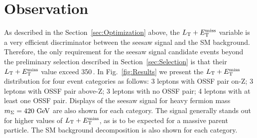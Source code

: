 \chapter{Observation}
\label{sec:Results}

As described in the Section~\ref{sec:Optimization} above, the $L_\textrm{T} + E_{\mathrm{T}}^{\text{miss}}$ variable is a very efficient discriminator between the seesaw signal and the SM background. Therefore, the only requirement for the seesaw signal candidate events beyond the preliminary selection described in Section~\ref{sec:Selection} is that their $L_\textrm{T} + E_{\mathrm{T}}^{\text{miss}}$ value exceed 350\,\GeV. In Fig.~\ref{fig:Results} we present the $L_\textrm{T} + E_{\mathrm{T}}^{\text{miss}}$ distribution for four event categories as follows: 3 leptons with OSSF pair on-Z; 3 leptons with OSSF pair above-Z; 3 leptons with no OSSF pair; 4 leptons with at least one OSSF pair. Displays of the seesaw signal for heavy fermion mass $m_\Sigma = 420\,\,\text{Ge\hspace{-.08em}V}$ are also shown for each category. The signal generally stands out for higher values of $L_\textrm{T} + E_{\mathrm{T}}^{\text{miss}}$, as is to be expected for a massive parent particle. The SM background decomposition is also shown for each category.

